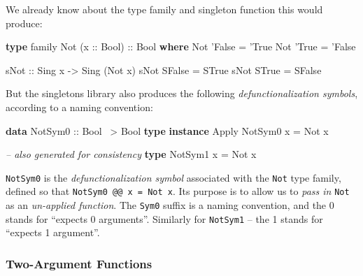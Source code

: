 \documentclass[]{article}
\newenvironment{Shaded}{}{}
\newcommand{\CommentTok}[1]{\textcolor[rgb]{0.38,0.63,0.69}{\textit{#1}}}
\newcommand{\DataTypeTok}[1]{\textcolor[rgb]{0.56,0.13,0.00}{#1}}
\newcommand{\FunctionTok}[1]{\textcolor[rgb]{0.02,0.16,0.49}{#1}}
\newcommand{\KeywordTok}[1]{\textcolor[rgb]{0.00,0.44,0.13}{\textbf{#1}}}
\newcommand{\NormalTok}[1]{#1}
\newcommand{\OtherTok}[1]{\textcolor[rgb]{0.00,0.44,0.13}{#1}}
\begin{document}
We already know about the type family and singleton function this would produce:

\begin{Shaded}
\begin{Highlighting}[]
\KeywordTok{type}\NormalTok{ family }\DataTypeTok{Not}\NormalTok{ (}\OtherTok{x ::} \DataTypeTok{Bool}\NormalTok{)}\OtherTok{ ::} \DataTypeTok{Bool} \KeywordTok{where}
    \DataTypeTok{Not}\NormalTok{ '}\DataTypeTok{False} \FunctionTok{=}\NormalTok{ '}\DataTypeTok{True}
    \DataTypeTok{Not}\NormalTok{ '}\DataTypeTok{True}  \FunctionTok{=}\NormalTok{ '}\DataTypeTok{False}

\OtherTok{sNot ::} \DataTypeTok{Sing}\NormalTok{ x }\OtherTok{->} \DataTypeTok{Sing}\NormalTok{ (}\DataTypeTok{Not}\NormalTok{ x)}
\NormalTok{sNot }\DataTypeTok{SFalse} \FunctionTok{=} \DataTypeTok{STrue}
\NormalTok{sNot }\DataTypeTok{STrue}  \FunctionTok{=} \DataTypeTok{SFalse}
\end{Highlighting}
\end{Shaded}

But the singletons library also produces the following \emph{defunctionalization
symbols}, according to a naming convention:

\begin{Shaded}
\begin{Highlighting}[]
\KeywordTok{data} \DataTypeTok{NotSym0}\OtherTok{ ::} \DataTypeTok{Bool} \FunctionTok{~>} \DataTypeTok{Bool}
\KeywordTok{type} \KeywordTok{instance} \DataTypeTok{Apply} \DataTypeTok{NotSym0}\NormalTok{ x }\FunctionTok{=} \DataTypeTok{Not}\NormalTok{ x}

\CommentTok{-- also generated for consistency}
\KeywordTok{type} \DataTypeTok{NotSym1}\NormalTok{ x }\FunctionTok{=} \DataTypeTok{Not}\NormalTok{ x}
\end{Highlighting}
\end{Shaded}

\texttt{NotSym0} is the \emph{defunctionalization symbol} associated with the
\texttt{Not} type family, defined so that \texttt{NotSym0\ @@\ x\ =\ Not\ x}.
Its purpose is to allow us to \emph{pass in} \texttt{Not} as an \emph{un-applied
function}. The \texttt{Sym0} suffix is a naming convention, and the 0 stands for
``expects 0 arguments''. Similarly for \texttt{NotSym1} -- the 1 stands for
``expects 1 argument''.

\hypertarget{two-argument-functions}{%
\subsubsection{Two-Argument Functions}\label{two-argument-functions}}
\end{document}
